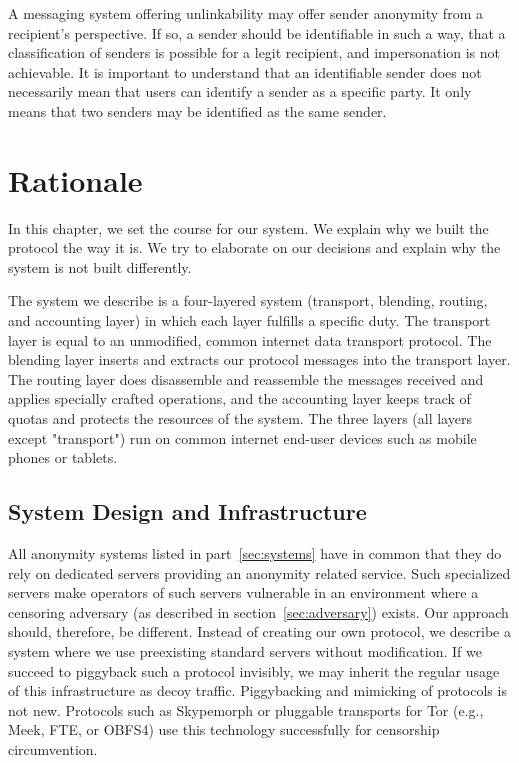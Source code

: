 A messaging system offering unlinkability may offer sender anonymity from a recipient's perspective. If so, a sender should be identifiable in such a way, that a classification of senders is possible for a legit recipient, and impersonation is not achievable. It is important to understand that an identifiable sender does not necessarily mean that users can identify a sender as a specific party. It only means that two senders may be identified as the same sender.

\chapter{Rationale\label{sec:rationale}}
In this chapter, we set the course for our system. We explain why we built the protocol the way it is. We try to elaborate on our decisions and explain why the system is not built differently.

The system we describe is a four-layered system (transport, blending, routing, and accounting layer) in which each layer fulfills a specific duty. The transport layer is equal to an unmodified, common internet data transport protocol. The blending layer inserts and extracts our protocol messages into the transport layer. The routing layer does disassemble and reassemble the messages received and applies specially crafted operations, and the accounting layer keeps track of quotas and protects the resources of the system. The three \MessageVortex{} layers (all layers except "transport") run on common internet end-user devices such as mobile phones or tablets.

\section{System Design and Infrastructure}
All anonymity systems listed in part~\ref{sec:systems} have in common that they do rely on dedicated servers providing an anonymity related service. Such specialized servers make operators of such servers vulnerable in an environment where a censoring adversary (as described in section~\ref{sec:adversary}) exists. Our approach should, therefore, be different. Instead of creating our own protocol, we describe a system where we use preexisting standard servers without modification. If we succeed to piggyback such a protocol invisibly, we may inherit the regular usage of this infrastructure as decoy traffic. Piggybacking and mimicking of protocols is not new. Protocols such as Skypemorph\cite{mohajeri2012skypemorph} or pluggable transports for Tor (e.g., Meek, FTE, or OBFS4) use this technology successfully for censorship circumvention.


